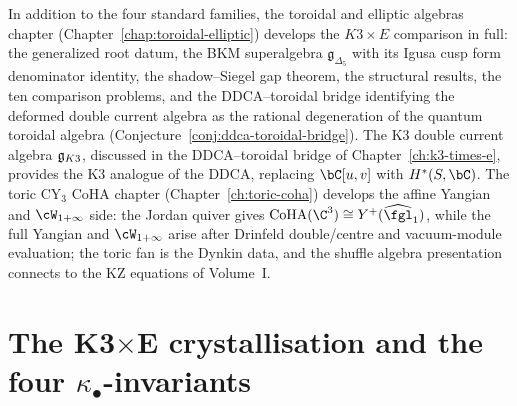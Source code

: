 In addition to the four standard families, the toroidal and
elliptic algebras chapter (Chapter~\ref{chap:toroidal-elliptic})
develops the \(K3 \times E\) comparison in full: the generalized
root datum, the BKM superalgebra $\mathfrak{g}_{\Delta_5}$
with its Igusa cusp form denominator identity, the
shadow--Siegel gap theorem, the structural results, the ten comparison problems, and
the DDCA--toroidal bridge identifying the deformed double
current algebra as the rational degeneration of the quantum
toroidal algebra (Conjecture~\ref{conj:ddca-toroidal-bridge}).
The K3 double current algebra $\mathfrak{g}_{K3}$, discussed in the
DDCA--toroidal bridge of Chapter~\ref{ch:k3-times-e}, provides
the K3 analogue of the DDCA, replacing $\bC[u, v]$ with
$H^*(S, \bC)$. The toric CY$_3$ CoHA chapter
(Chapter~\ref{ch:toric-coha}) develops the affine Yangian and
$\cW_{1+\infty}$ side: the Jordan quiver gives
$\CoHA(\C^3)\cong Y^+(\widehat{\fgl}_1)$, while the full Yangian and
$\cW_{1+\infty}$ arise after Drinfeld double/centre and vacuum-module
evaluation; the toric fan is the Dynkin data, and the shuffle algebra presentation
connects to the KZ equations of Volume~I.

\section{The K3\texorpdfstring{$\times$}{x}E crystallisation and the four \texorpdfstring{$\kappa_\bullet$}{kappa-.}-invariants}
\label{sec:v3-intro-kappa-crystallisation}

